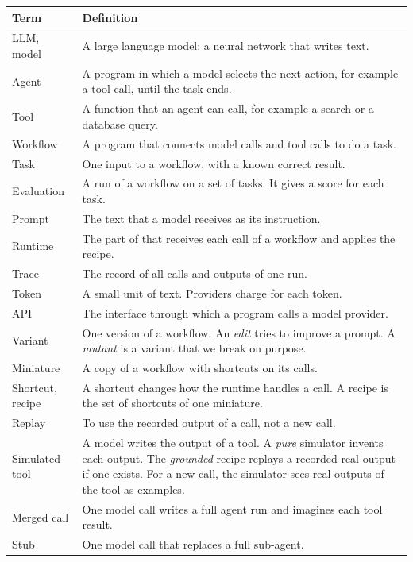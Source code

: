 \begin{table}[t]
\centering\scriptsize
\renewcommand{\arraystretch}{1.05}
\begin{tabular}{@{}p{17mm}p{54.5mm}@{}}
\toprule
\textbf{Term} & \textbf{Definition} \\
\midrule
LLM, model & A large language model: a neural network that writes text. \\
Agent & A program in which a model selects the next action, for example a tool call, until the
task ends. \\
Tool & A function that an agent can call, for example a search or a database query. \\
Workflow & A program that connects model calls and tool calls to do a task. \\
Task & One input to a workflow, with a known correct result. \\
Evaluation & A run of a workflow on a set of tasks. It gives a score for each task. \\
Prompt & The text that a model receives as its instruction. \\
Runtime & The part of \sys{} that receives each call of a workflow and applies the recipe. \\
Trace & The record of all calls and outputs of one run. \\
Token & A small unit of text. Providers charge for each token. \\
API & The interface through which a program calls a model provider. \\
Variant & One version of a workflow. An \emph{edit} tries to improve a prompt. A \emph{mutant} is a
variant that we break on purpose. \\
Miniature & A copy of a workflow with shortcuts on its calls. \\
Shortcut, recipe & A shortcut changes how the runtime handles a call. A recipe is the set of
shortcuts of one miniature. \\
Replay & To use the recorded output of a call, not a new call. \\
Simulated tool & A model writes the output of a tool. A \emph{pure} simulator invents each
output. The \emph{grounded} recipe replays a recorded real output if one exists. For a new call,
the simulator sees real outputs of the tool as examples. \\
Merged call & One model call writes a full agent run and imagines each tool result. \\
Stub & One model call that replaces a full sub-agent. \\

\end{tabular}
\end{table}
